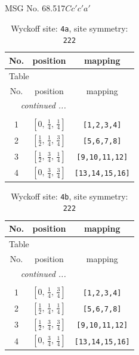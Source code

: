 \documentclass[fleqn,8pt]{jsarticle}
\begin{document}
\setcounter{MaxMatrixCols}{32}

\renewcommand{\tablename}{Table~}
\renewcommand{\figurename}{Figure~}
\begin{center}
\LARGE
MSG No. 68.517\quad$Cc'c'a'$
\end{center}
\renewcommand{\arraystretch}{1.2}
\begin{longtable}{ccc}
\caption{Wyckoff site: {\tt 4a}, site symmetry: {\tt 222}}
 \\
 \hline \hline
No. & position & mapping \\ \hline \endfirsthead

\multicolumn{2}{l}{\tablename\ \thetable{}} \\
 \hline \hline
No. & position & mapping \\ \hline \endhead

 \hline \hline
\multicolumn{2}{r}{\footnotesize\it continued ...} \\ \endfoot

 \hline \hline
\multicolumn{2}{r}{} \\ \endlastfoot

1 & $\left[ 0,\, \frac{1}{4},\, \frac{1}{4} \right]$ & {\tt [1,2,3,4]} \\ \hline
2 & $\left[ \frac{1}{2},\, \frac{1}{4},\, \frac{3}{4} \right]$ & {\tt [5,6,7,8]} \\ \hline
3 & $\left[ \frac{1}{2},\, \frac{3}{4},\, \frac{1}{4} \right]$ & {\tt [9,10,11,12]} \\ \hline
4 & $\left[ 0,\, \frac{3}{4},\, \frac{3}{4} \right]$ & {\tt [13,14,15,16]} \\
\end{longtable}
\renewcommand{\arraystretch}{1.2}
\begin{longtable}{ccc}
\caption{Wyckoff site: {\tt 4b}, site symmetry: {\tt 222}}
 \\
 \hline \hline
No. & position & mapping \\ \hline \endfirsthead

\multicolumn{2}{l}{\tablename\ \thetable{}} \\
 \hline \hline
No. & position & mapping \\ \hline \endhead

 \hline \hline
\multicolumn{2}{r}{\footnotesize\it continued ...} \\ \endfoot

 \hline \hline
\multicolumn{2}{r}{} \\ \endlastfoot

1 & $\left[ 0,\, \frac{1}{4},\, \frac{3}{4} \right]$ & {\tt [1,2,3,4]} \\ \hline
2 & $\left[ \frac{1}{2},\, \frac{1}{4},\, \frac{1}{4} \right]$ & {\tt [5,6,7,8]} \\ \hline
3 & $\left[ \frac{1}{2},\, \frac{3}{4},\, \frac{3}{4} \right]$ & {\tt [9,10,11,12]} \\ \hline
4 & $\left[ 0,\, \frac{3}{4},\, \frac{1}{4} \right]$ & {\tt [13,14,15,16]} \\
\end{longtable}
\end{document}
